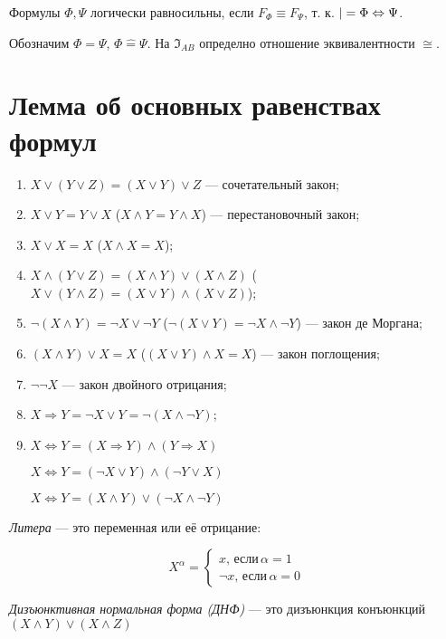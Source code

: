 Формулы $\Phi, \Psi$ логически равносильны, если $F_\Phi \equiv F_\Psi$, т. к. $|= \Phi \Leftrightarrow \Psi$.

Обозначим $\Phi = \Psi$, $\Phi \hat{=} \Psi$. На $\mathfrak{I}_{AB}$ определно отношение эквивалентности $\cong$.

\section{Лемма об основных равенствах формул}

\begin{enumerate}
    \item $X \lor (Y \lor Z) = (X \lor Y) \lor Z$ --- сочетательный закон;
    \item $X \lor Y = Y \lor X$ ($X \land Y = Y \land X$) --- перестановочный закон;
    \item $X \lor X = X$ ($X \land X = X$);
    \item $X \land (Y \lor Z) = (X \land Y) \lor (X \land Z)$ ($X \lor (Y \land Z) = (X \lor Y) \land (X \lor Z)$);
    \item $\lnot(X \land Y) = \lnot X \lor \lnot Y$ ($\lnot(X \lor Y) = \lnot X \land \lnot Y$) --- закон де Моргана;
    \item $(X \land Y) \lor X = X$ ($(X \lor Y) \land X = X$) --- закон поглощения;
    \item $\lnot \lnot X$ --- закон двойного отрицания;
    \item $X \Rightarrow Y = \lnot X \lor Y = \lnot(X \land \lnot Y)$;
    \item $X \Leftrightarrow Y = (X \Rightarrow Y) \land (Y \Rightarrow X)$
    
    $X \Leftrightarrow Y = (\lnot X \lor Y) \land (\lnot Y \lor X)$

    $X \Leftrightarrow Y = (X \land Y) \lor (\lnot X \land \lnot Y)$
\end{enumerate}

\dftion \textit{Литера} --- это переменная или её отрицание:

\begin{equation*}
    X^\alpha = 
        \left\{ \begin{aligned}
        x, \, \text{если} \, \alpha = 1 \\
        \lnot x, \, \text{если} \, \alpha = 0
        \end{aligned} \right.
\end{equation*}

\dftion \textit{Дизъюнктивная нормальная форма (ДНФ)} --- это дизъюнкция конъюнкций $(X \land Y) \lor (X \land Z)$

